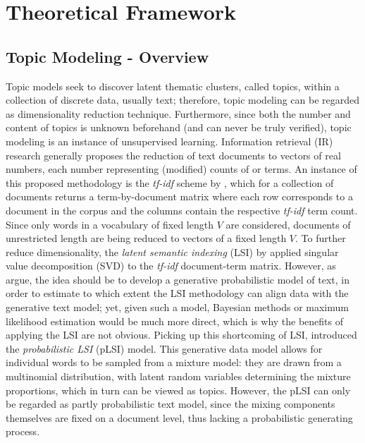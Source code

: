 \section{Theoretical Framework}
\label{Theoretical Framework}

\subsection{Topic Modeling - Overview}
\label{Topic Modeling - Overview}

Topic models seek to discover latent thematic clusters, called topics, within a collection of discrete data, usually text; therefore, topic modeling can be regarded as dimensionality reduction technique. Furthermore, since both the number and content of topics is unknown beforehand (and can never be truly verified), topic modeling is an instance of unsupervised learning. Information retrieval (IR) research generally proposes the reduction of text documents to vectors of real numbers, each number representing (modified) counts of or terms. An instance of this proposed methodology is the \textit{tf-idf} scheme by \cite{salton1983information}, which for a collection of documents returns a term-by-document matrix where each row corresponds to a document in the corpus and the columns contain the respective \textit{tf-idf} term count. Since only words in a vocabulary of fixed length $V$ are considered, documents of unrestricted length are being reduced to vectors of a fixed length $V$. To further reduce dimensionality, the \textit{latent semantic indexing} (LSI) by \cite{deerwester1990indexing} applied singular value decomposition (SVD) to the \textit{tf-idf} document-term matrix. However, as \cite{blei2003latent} argue, the idea should be to develop a generative probabilistic model of text, in order to estimate to which extent the LSI methodology can align data with the generative text model; yet, given such a model, Bayesian methods or maximum likelihood estimation would be much more direct, which is why the benefits of applying the LSI are not obvious. Picking up this shortcoming of LSI, \cite{hofmann1999probabilistic} introduced the \textit{probabilistic LSI} (pLSI) model. This generative data model allows for individual words to be sampled from a mixture model: they are drawn from a multinomial distribution, with latent random variables determining the mixture proportions, which in turn can be viewed as topics. However, the pLSI can only be regarded as partly probabilistic text model, since the mixing components themselves are fixed on a document level, thus lacking a probabilistic generating process.


